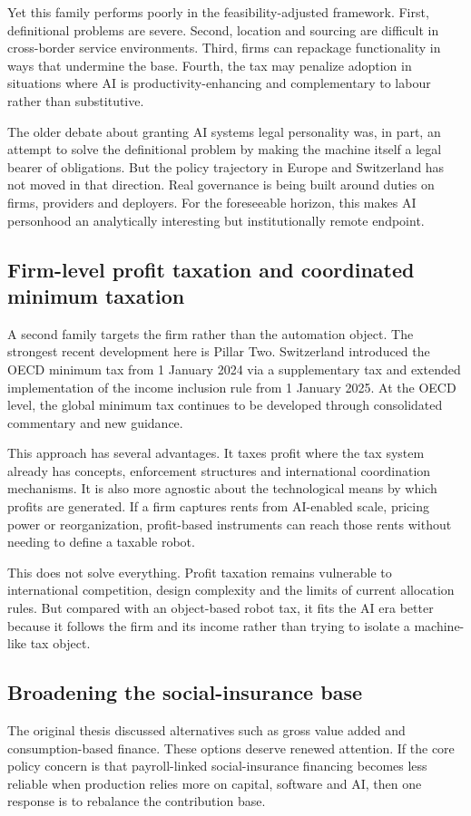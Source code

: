 \documentclass[11pt]{article}
\begin{document}
Yet this family performs poorly in the feasibility-adjusted framework. First, definitional problems are severe. Second, location and sourcing are difficult in cross-border service environments. Third, firms can repackage functionality in ways that undermine the base. Fourth, the tax may penalize adoption in situations where AI is productivity-enhancing and complementary to labour rather than substitutive.

The older debate about granting AI systems legal personality was, in part, an attempt to solve the definitional problem by making the machine itself a legal bearer of obligations. But the policy trajectory in Europe and Switzerland has not moved in that direction. Real governance is being built around duties on firms, providers and deployers. For the foreseeable horizon, this makes AI personhood an analytically interesting but institutionally remote endpoint.

\subsection{Firm-level profit taxation and coordinated minimum taxation}
A second family targets the firm rather than the automation object. The strongest recent development here is Pillar Two. Switzerland introduced the OECD minimum tax from 1 January 2024 via a supplementary tax and extended implementation of the income inclusion rule from 1 January 2025. At the OECD level, the global minimum tax continues to be developed through consolidated commentary and new guidance.

This approach has several advantages. It taxes profit where the tax system already has concepts, enforcement structures and international coordination mechanisms. It is also more agnostic about the technological means by which profits are generated. If a firm captures rents from AI-enabled scale, pricing power or reorganization, profit-based instruments can reach those rents without needing to define a taxable robot.

This does not solve everything. Profit taxation remains vulnerable to international competition, design complexity and the limits of current allocation rules. But compared with an object-based robot tax, it fits the AI era better because it follows the firm and its income rather than trying to isolate a machine-like tax object.

\subsection{Broadening the social-insurance base}
The original thesis discussed alternatives such as gross value added and consumption-based finance. These options deserve renewed attention. If the core policy concern is that payroll-linked social-insurance financing becomes less reliable when production relies more on capital, software and AI, then one response is to rebalance the contribution base.
\end{document}
